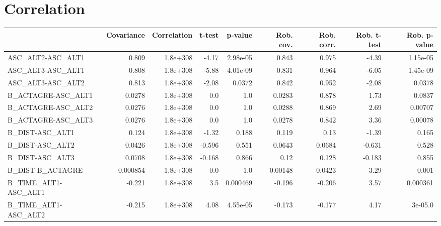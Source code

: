 \section{Correlation}
\begin{tabular}{lrrrrrrrr}
\toprule
{} &  Covariance &  Correlation &  t-test &  p-value &  Rob. cov. &  Rob. corr. &  Rob. t-test &  Rob. p-value \\
\midrule
ASC\_ALT2-ASC\_ALT1                 &       0.809 &     1.8e+308 &   -4.17 & 2.98e-05 &      0.843 &       0.975 &        -4.39 &      1.15e-05 \\
ASC\_ALT3-ASC\_ALT1                 &       0.808 &     1.8e+308 &   -5.88 & 4.01e-09 &      0.831 &       0.964 &        -6.05 &      1.45e-09 \\
ASC\_ALT3-ASC\_ALT2                 &       0.813 &     1.8e+308 &   -2.08 &   0.0372 &      0.842 &       0.952 &        -2.08 &        0.0378 \\
B\_ACTAGRE-ASC\_ALT1                &      0.0278 &     1.8e+308 &     0.0 &      1.0 &     0.0283 &       0.878 &         1.73 &        0.0837 \\
B\_ACTAGRE-ASC\_ALT2                &      0.0276 &     1.8e+308 &     0.0 &      1.0 &     0.0288 &       0.869 &         2.69 &       0.00707 \\
B\_ACTAGRE-ASC\_ALT3                &      0.0276 &     1.8e+308 &     0.0 &      1.0 &     0.0278 &       0.842 &         3.36 &       0.00078 \\
B\_DIST-ASC\_ALT1                   &       0.124 &     1.8e+308 &   -1.32 &    0.188 &      0.119 &        0.13 &        -1.39 &         0.165 \\
B\_DIST-ASC\_ALT2                   &      0.0426 &     1.8e+308 &  -0.596 &    0.551 &     0.0643 &      0.0684 &       -0.631 &         0.528 \\
B\_DIST-ASC\_ALT3                   &      0.0708 &     1.8e+308 &  -0.168 &    0.866 &       0.12 &       0.128 &       -0.183 &         0.855 \\
B\_DIST-B\_ACTAGRE                  &    0.000854 &     1.8e+308 &     0.0 &      1.0 &   -0.00148 &     -0.0423 &        -3.29 &         0.001 \\
B\_TIME\_ALT1-ASC\_ALT1              &      -0.221 &     1.8e+308 &     3.5 & 0.000469 &     -0.196 &      -0.206 &         3.57 &      0.000361 \\
B\_TIME\_ALT1-ASC\_ALT2              &      -0.215 &     1.8e+308 &    4.08 & 4.55e-05 &     -0.173 &      -0.177 &         4.17 &       3e-05.0 \\

\end{tabular}
